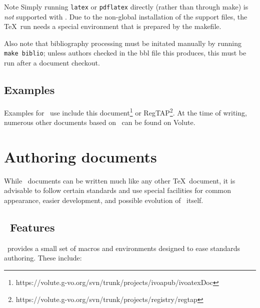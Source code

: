 \documentclass[11pt,a4paper]{ivoa}
\begin{document}
\begin{admonition}{Note}
Simply running \texttt{latex} or \texttt{pdflatex} directly
(rather than through make) is \emph{not} supported with \ivoatex.  Due
to the non-global installation of the support files, the \TeX\ run needs
a special environment that is prepared by the makefile.

Also note that bibliography processing must be initated manually by
running \texttt{make biblio}; unless authors checked in the bbl file
this produces, this must be run after a document checkout.
\end{admonition}

\subsection{Examples}

Examples for \ivoatex\ use include this 
document\footnote{https://volute.g-vo.org/svn/trunk/projects/ivoapub/ivoatexDoc}
or
RegTAP\footnote{https://volute.g-vo.org/svn/trunk/projects/registry/regtap}.
At the time of writing, numerous other documents based on \ivoatex~can
be found on Volute.


\section{Authoring documents}
\label{sect:authoring}

While \ivoatex\ documents can be written much like any other \TeX\
document, it is advisable to follow certain standards and use special
facilities for common appearance, easier development, and possible
evolution of \ivoatex\ itself.

\subsection{\ivoatex\ Features}

\ivoatex\ provides a small set of macros and environments designed
to ease standards authoring.  These include:
\end{document}
